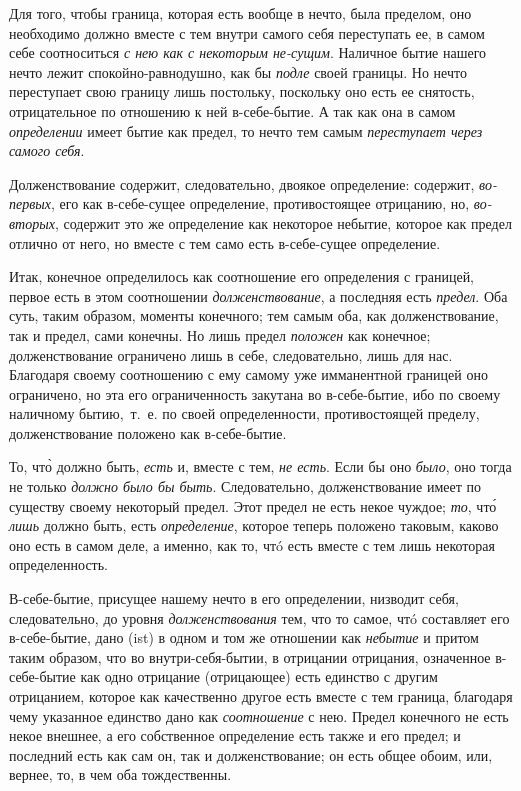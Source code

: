 Для того, чтобы граница, которая есть вообще в нечто, была пределом, оно
необходимо должно вместе с тем внутри самого себя переступать ее, в самом
себе соотноситься {\em с нею как с некоторым не-сущим}.
Наличное бытие нашего нечто лежит спокойно-равнодушно, как бы
{\em подле} своей границы. Но нечто переступает свою
границу лишь постольку, поскольку оно есть ее снятость, отрицательное по
отношению к ней в-себе-бытие. А так как она в самом
{\em определении} имеет бытие как предел, то нечто тем
самым {\em переступает через самого себя}.

Долженствование содержит, следовательно, двоякое определение: содержит,
{\em во-первых}, его как в-себе-сущее определение,
противостоящее отрицанию, но, {\em во-вторых}, содержит
это же определение как некоторое небытие, которое как предел отлично от
него, но вместе с тем само есть в-себе-сущее определение.

Итак, конечное определилось как соотношение его определения с границей,
первое есть в этом соотношении {\em долженствование}, а
последняя есть {\em предел}. Оба суть, таким образом,
моменты конечного; тем самым оба, как долженствование, так и предел, сами
конечны. Но лишь предел {\em положен} как конечное;
долженствование ограничено лишь в себе, следовательно, лишь для нас.
Благодаря своему соотношению с ему самому уже имманентной границей оно
ограничено, но эта его ограниченность закутана во в-себе-бытие, ибо по
своему наличному бытию,~т.~е. по своей определенности, противостоящей
пределу, долженствование положено как в-себе-бытие.

То, чт\`{о} должно быть, {\em есть} и, вместе с тем,
{\em не есть}. Если бы оно
{\em было}, оно тогда не только
{\em должно было бы быть}. Следовательно,
долженствование имеет по существу своему некоторый предел. Этот предел не
есть некое чуждое; {\em то}, чт\'{о}
{\em лишь} должно быть, есть
{\em определение}, которое теперь положено таковым,
каково оно есть в самом деле, а именно, как то, чтó есть вместе с тем лишь
некоторая определенность.

В-себе-бытие, присущее нашему нечто в его определении, низводит себя,
следовательно, до уровня {\em долженствования} тем, что
то самое, чтó составляет его в-себе-бытие, дано (ist) в одном и том же
отношении как {\em небытие} и притом таким образом, что
во внутри-себя-бытии, в отрицании отрицания, означенное в-себе-бытие как
одно отрицание (отрицающее) есть единство с другим отрицанием, которое как
качественно другое есть вместе с тем граница, благодаря чему указанное
единство дано как {\em соотношение} с нею. Предел
конечного не есть некое внешнее, а его собственное определение есть также и
его предел; и последний есть как сам он, так и долженствование; он есть
общее обоим, или, вернее, то, в чем оба тождественны.

